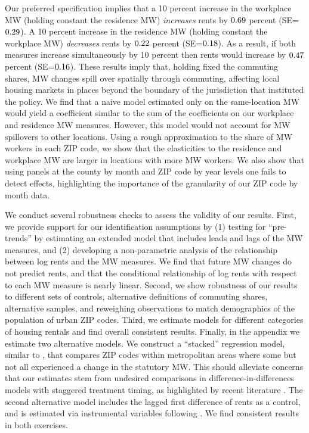 
Our preferred specification implies that 
a 10 percent increase in the workplace MW (holding constant the residence MW) 
\textit{increases} rents by $0.69$ percent 
(SE=$0.29$).
A 10 percent increase in the residence MW (holding constant the workplace MW) 
\textit{decreases} rents by $0.22$ percent 
(SE=$0.18$). 
As a result, if both measures increase simultaneously by 10 percent then 
rents would increase by $0.47$ percent 
(SE=$0.16$).
These results imply that, holding fixed the commuting shares, MW 
changes spill over spatially through commuting, affecting local housing markets 
in places beyond the boundary of the jurisdiction that instituted the policy.
We find that a naive model estimated only on the same-location MW would yield a 
coefficient similar to the sum of the coefficients on our workplace and 
residence MW measures.
However, this model would not account for MW spillovers to other locations.
Using a rough approximation to the share of MW workers in each ZIP code, we show 
that the elasticities to the residence and workplace MW are larger in locations 
with more MW workers.
We also show that using panels at the county by month and ZIP code by year levels 
one fails to detect effects, highlighting the importance of the granularity of 
our ZIP code by month data.


We conduct several robustness checks to assess the validity of our results.
First, we provide support for our identification assumptions by
(1) testing for ``pre-trends'' by estimating an extended model that includes 
leads and lags of the MW measures, and 
(2) developing a non-parametric analysis of the relationship between log rents
and the MW measures.
We find that future MW changes do not predict rents, and that the conditional
relationship of log rents with respect to each MW measure is nearly linear.
Second, we show robustness of our results to different sets of controls,
alternative definitions of commuting shares, alternative samples,
and reweighing observations to match demographics of the population of
urban ZIP codes.
Third, we estimate models for different categories of housing rentals and
find overall consistent results.
Finally, in the appendix we estimate two alternative models.
We construct a ``stacked'' regression model, similar to \textcite{CegnizEtAl2019},
that compares ZIP codes within metropolitan areas where some but not all 
experienced a change in the statutory MW.
This should alleviate concerns that our estimates stem from undesired 
comparisons in difference-in-differences models with staggered treatment timing, 
as highlighted by recent literature 
\parencite{deChaisemartinEtAl2022,RothEtAl2022}.
The second alternative model includes the lagged first difference of rents as 
a control, and is estimated via instrumental variables following 
\textcite{ArellanoBond1991}.
We find consistent results in both exercises.

